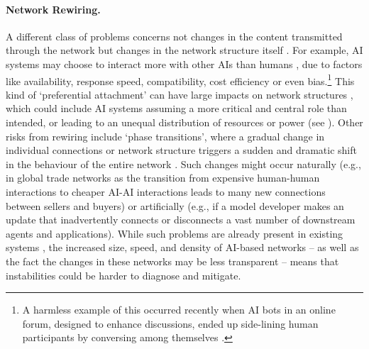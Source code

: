 \paragraph{Network Rewiring.}
A different class of problems concerns not changes in the content transmitted through the network but changes in the network structure itself \citep{Albert2000}.
For example, AI systems may choose to interact more with other AIs than humans \citep{Liu2024,Panickssery2024,Goel2025,laurito2024aiaibiaslarge}, due to factors like availability, response speed, compatibility, cost efficiency or even bias.\footnote{A harmless example of this occurred recently when AI bots in an online forum, designed to enhance discussions, ended up side-lining human participants by conversing among themselves \citep{jan_private_comm}.}
This kind of `preferential attachment' can have large impacts on network structures \citep{Kunegis2013PreferentialAI,Maoz2012PreferentialAH}, which could include AI systems assuming a more critical and central role than intended, or leading to an unequal distribution of resources or power (see ).
Other risks from rewiring include `phase transitions', where a gradual change in individual connections or network structure triggers a sudden and dramatic shift in the behaviour of the entire network \citep[see also ]{newman_structure_2003}.
Such changes might occur naturally (e.g., in global trade networks as the transition from expensive human-human interactions to cheaper AI-AI interactions leads to many new connections between sellers and buyers) or artificially (e.g., if a model developer makes an update that inadvertently connects or disconnects a vast number of downstream agents and applications).
While such problems are already present in existing systems \citep{gao2016universal,vie2021connected}, the increased size, speed, and density of AI-based networks -- as well as the fact the changes in these networks may be less transparent -- means that instabilities could be harder to diagnose and mitigate.


